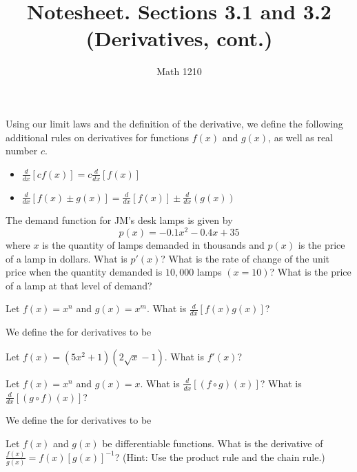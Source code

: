 \documentclass[12pt, a4paper]{article}
\author{Math 1210}
\title{Notesheet. Sections 3.1 and 3.2 (Derivatives, cont.)}
\date{}
\begin{document}
\maketitle
\nameline
\begin{thrm}
  Using our limit laws and the definition of the derivative, we define
  the following additional rules on derivatives for functions \(f(x)\)
  and \(g(x)\), as well as real number \(c\).
  \begin{itemize}
  \item \(\frac{d}{dx}[c f(x)] = c \frac{d}{dx}[f(x)]\)
  \item \(\frac{d}{dx}[f(x) \pm g(x)] = \frac{d}{dx}[f(x)] \pm
    \frac{d}{dx}(g(x))\)
  \end{itemize}
\end{thrm}
\begin{ex}
  The demand function for JM's desk lamps is given by \[
    p(x) = -0.1x^2 - 0.4x + 35
  \]
  where \(x\) is the quantity of lamps demanded in thousands and \(p(x)\) is
  the price of a lamp in dollars. What is \(p'(x)\)? What is the rate
  of change of the unit price when the quantity demanded is \(10,000\)
  lamps \((x = 10)\)? What is the price of a lamp at that level of demand?
\end{ex}
\begin{ex}
  Let \(f(x) = x^n\) and \(g(x) = x^m\). What is
  \(\frac{d}{dx}[f(x)g(x)]\)?
\end{ex}
\begin{defi}
  We define the  for derivatives to be
\end{defi}
\begin{ex}
  Let \(f(x) = (5x^2+1)(2 \sqrt{x}-1)\). What is \(f'(x)\)?
\end{ex}
\begin{ex}
  Let \(f(x) = x^n\) and \(g(x) = x\). What is \(\frac{d}{dx}[(f \circ
  g)(x)]\)? What is \(\frac{d}{dx}[(g \circ f)(x)]\)?
\end{ex}
\begin{defi}
  We define the  for derivatives to be
\end{defi}
\begin{ex}
  Let \(f(x)\) and \(g(x)\) be differentiable functions. What is the
  derivative of \(\frac{f(x)}{g(x)} = f(x)[g(x)]^{-1}\)? (Hint: Use
  the product rule and the chain rule.)
\end{ex}

\end{document}
